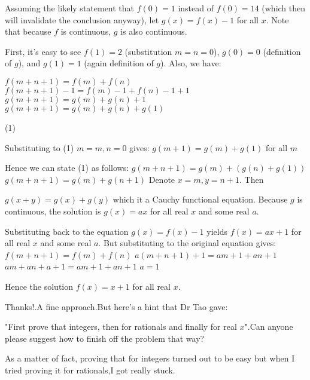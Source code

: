 \begin{solution}
	Assuming the likely statement that $f(0) = 1$ instead of $f(0) = 14$ (which then will invalidate the conclusion anyway), let $g(x) = f(x) - 1$ for all $x$. Note that because $f$ is continuous, $g$ is also continuous.

First, it's easy to see $f(1) = 2$ (substitution $m=n=0$), $g(0) = 0$ (definition of $g$), and $g(1) = 1$ (again definition of $g$). Also, we have:

$f(m+n+1) = f(m) + f(n)$
$f(m+n+1) - 1 = f(m) - 1 + f(n) - 1 + 1$
$g(m+n+1) = g(m) + g(n) + 1$
$g(m+n+1) = g(m) + g(n) + g(1)$ \begin{bolded}(1)\end{bolded}

Substituting to (1) $m=m,n=0$ gives:
$g(m+1) = g(m) + g(1)$ for all $m$

Hence we can state (1) as follows:
$g(m+n+1) = g(m) + (g(n) + g(1))$
$g(m+n+1) = g(m) + g(n+1)$
Denote $x=m,y=n+1$. Then

$g(x+y) = g(x) + g(y)$
which it a Cauchy functional equation. Because $g$ is continuous, the solution is $g(x) = ax$ for all real $x$ and some real $a$.

Substituting back to the equation $g(x) = f(x) - 1$ yields $f(x) = ax + 1$ for all real $x$ and some real $a$. But substituting to the original equation gives:
$f(m+n+1) = f(m) + f(n)$
$a(m+n+1) + 1 = am + 1 + an + 1$
$am + an + a + 1 = am + 1 + an + 1$
$a = 1$

Hence the solution $\boxed{f(x) = x+1}$ for all real $x$.
\end{solution}



\begin{solution}
	Thanks!.A fine approach.But here's a hint that Dr Tao gave:

"First prove that integers, then for rationals and finally for real $x$".Can anyone please suggest how to finish off the problem that way?

As a matter of fact, proving that for integers turned out to be easy but when I tried proving it for rationals,I got really stuck.
\end{solution}



